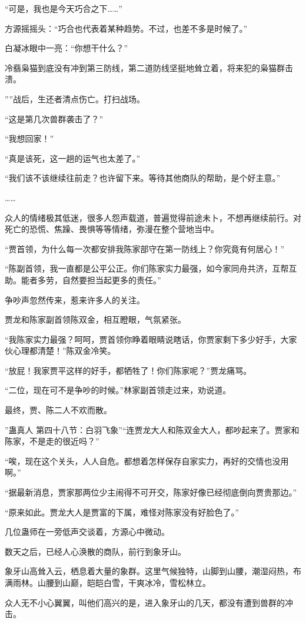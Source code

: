 \begin{this_body}
“可是，我也是今天巧合之下……”

方源摇摇头：“巧合也代表着某种趋势。不过，也差不多是时候了。”

白凝冰眼中一亮：“你想干什么？”

冷翡枭猫到底没有冲到第三防线，第二道防线坚挺地耸立着，将来犯的枭猫群击溃。

””战后，生还者清点伤亡。打扫战场。

“这是第几次兽群袭击了？”

“我想回家！”

“真是该死，这一趟的运气也太差了。”

“我们该不该继续往前走？也许留下来。等待其他商队的帮助，是个好主意。”

……

众人的情绪极其低迷，很多人怨声载道，普遍觉得前途未卜，不想再继续前行。对死亡的恐慌、焦躁、畏惧等等情绪，弥漫在整个营地当中。

“贾首领，为什么每一次都安排我陈家部守在第一防线上？你究竟有何居心！”

“陈副首领，我一直都是公平公正。你们陈家实力最强，如今家同舟共济，互帮互助。能者多劳，自然要担当起更多的责任。”

争吵声忽然传来，惹来许多人的关注。

贾龙和陈家副首领陈双金，相互瞪眼，气氛紧张。

“我陈家实力最强？呵呵，贾首领你睁着眼睛说瞎话，你贾家剩下多少好手，大家伙心理都清楚！”陈双金冷笑。

“放屁！我家贾平这样的好手，都牺牲了！你们陈家呢？”贾龙痛骂。

“二位，现在可不是争吵的时候。”林家副首领走过来，劝说道。

最终，贾、陈二人不欢而散。

”蛊真人 第四十八节：白羽飞象”“连贾龙大人和陈双金大人，都吵起来了。贾家和陈家，不是走的很近吗？”

“唉，现在这个关头，人人自危。都想着怎样保存自家实力，再好的交情也没用啊。”

“据最新消息，贾家那两位少主闹得不可开交，陈家好像已经彻底倒向贾贵那边。”

“原来如此。贾龙大人是贾富的下属，难怪对陈家没有好脸色了。”

几位蛊师在一旁低声交谈着，方源心中微动。

数天之后，已经人心涣散的商队，前行到象牙山。

象牙山高耸入云，栖息着大量的象群。这里气候独特，山脚到山腰，潮湿闷热，布满雨林。山腰到山巅，皑皑白雪，干爽冰冷，雪松林立。

众人无不小心翼翼，叫他们高兴的是，进入象牙山的几天，都没有遭到兽群的冲击。


\end{this_body}

